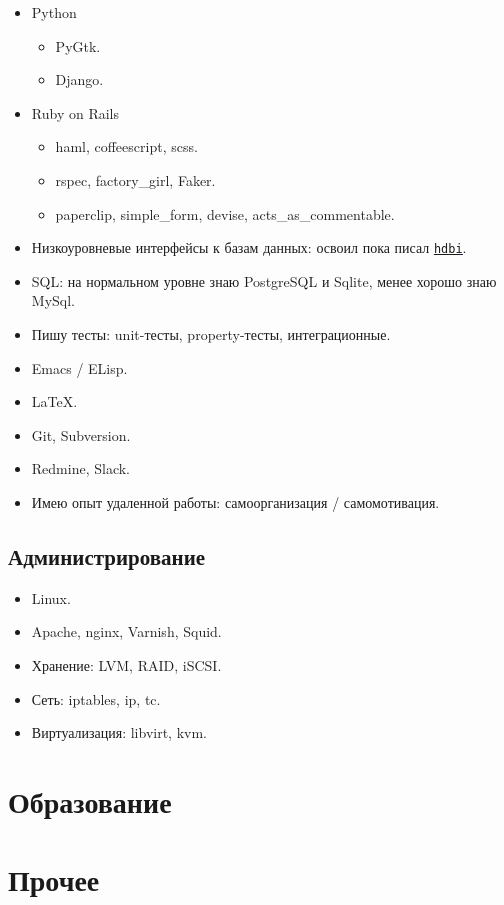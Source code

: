 \documentclass[11pt,a4paper,sans]{moderncv}
\newcommand*{\nlink}[2]{\textcolor{blue}{\texttt{\underline{\href{#1}{#2}}}}}
\begin{document}
\begin{itemize}
\item Python
  \begin{itemize}
  \item PyGtk.
  \item Django.
  \end{itemize}
\item Ruby on Rails
  \begin{itemize}
  \item haml, coffeescript, scss.
  \item rspec, factory\_girl, Faker.
  \item paperclip, simple\_form, devise, acts\_as\_commentable.
  \end{itemize}
\item Низкоуровневые интерфейсы к базам данных: освоил пока писал
  \nlink{http://hackage.haskell.org/package/hdbi}{hdbi}.
\item SQL: на нормальном уровне знаю PostgreSQL и Sqlite, менее хорошо
  знаю MySql.
\item Пишу тесты: unit-тесты, property-тесты, интеграционные.
\item Emacs / ELisp.
\item \LaTeX.
\item Git, Subversion.
\item Redmine, Slack.
\item Имею опыт удаленной работы: самоорганизация / самомотивация.
\end{itemize}

\subsection{Администрирование}

\begin{itemize}
\item Linux.
\item Apache, nginx, Varnish, Squid.
\item Хранение: LVM, RAID, iSCSI.
\item Сеть: iptables, ip, tc.
\item Виртуализация: libvirt, kvm.
\end{itemize}

\section{Образование}


\section{Прочее}

\nocite{*}

\end{document}
